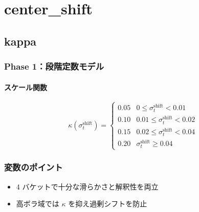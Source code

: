 
\section*{center\_shift}\nopagebreak[4]

\subsection*{kappa}\nopagebreak[4]

\subsubsection*{Phase 1：段階定数モデル}\nopagebreak[4]
\paragraph{スケール関数}
\begin{flushleft}
\begin{equation*}
\kappa(\sigma_t^{\text{shift}})=
  \begin{cases}
    0.05 & 0 \le \sigma_t^{\text{shift}} < 0.01\\[4pt]
    0.10 & 0.01 \le \sigma_t^{\text{shift}} < 0.02\\[4pt]
    0.15 & 0.02 \le \sigma_t^{\text{shift}} < 0.04\\[4pt]
    0.20 & \sigma_t^{\text{shift}} \ge 0.04
  \end{cases}
\end{equation*}
\end{flushleft}

\subsubsection*{変数のポイント}
\begin{flushleft}
\begin{itemize}
  \item 4 バケットで十分な滑らかさと解釈性を両立
  \item 高ボラ域では \(\kappa\) を抑え過剰シフトを防止
\end{itemize}
\end{flushleft}

